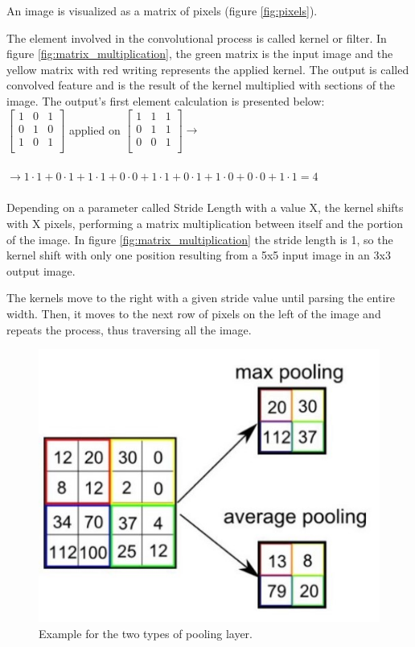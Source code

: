 \documentclass[runningheads,a4paper,12pt]{report}
\begin{document}
An image is visualized as a matrix of pixels (figure \ref{fig:pixels}). 

The element involved in the convolutional process is called kernel or filter. In figure \ref{fig:matrix_multiplication}, the green matrix is the input image and the yellow matrix with red writing represents the applied kernel. The output is called convolved feature and is the result of the kernel multiplied with sections of the image. The output's first element calculation is presented below:
\\

${
\left[
  \begin{array}{ccc}
    1 & 0 & 1 \\
    0 & 1 & 0 \\
    1 & 0 & 1 \\ 
  \end{array}
\right]
}$ 
applied on 
${ 
\left[
  \begin{array}{ccc}
    1 & 1 & 1 \\
    0 & 1 & 1 \\
    0 & 0 & 1 \\ 
  \end{array}
\right]
\rightarrow}$
\\
\\
${
\rightarrow
1 \cdot 1 + 0 \cdot 1 + 1 \cdot 1 + 0 \cdot 0 + 1 \cdot 1 + 0 \cdot 1 + 1 \cdot 0 + 0 \cdot 0 + 1 \cdot 1 = 4
}$ 
\\
\\
Depending on a parameter called Stride Length with a value X, the kernel shifts with X pixels, performing a matrix multiplication between itself and the portion of the image. In figure \ref{fig:matrix_multiplication} the stride length is 1, so the kernel shift with only one position resulting from a 5x5 input image in an 3x3 output image.

The kernels move to the right with a given stride value until parsing the entire width. Then, it moves to the next row of pixels on the left of the image and repeats the process, thus traversing all the image.

\begin{figure}[h]
	\centering

  	\includegraphics[width=0.5\linewidth]{./images/1_pooling}\hfill

    \caption{Example for the two types of pooling layer.}  
    \label{fig:pooling}
\end{figure} 
\end{document}
